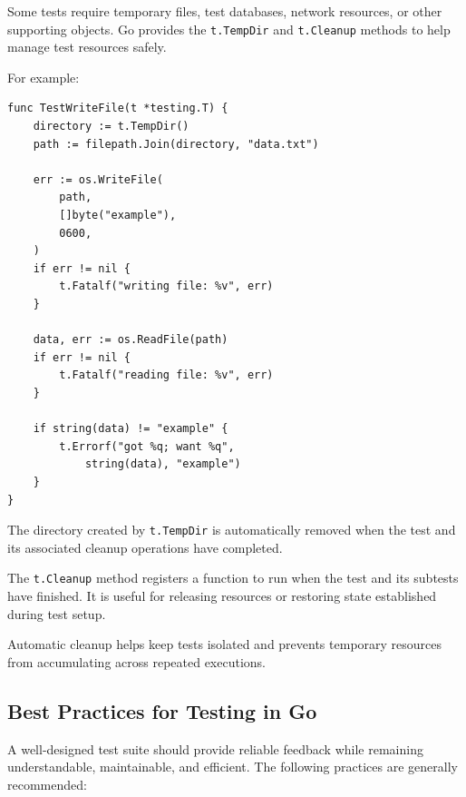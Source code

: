 Some tests require temporary files, test databases, network resources, or other supporting objects. Go provides the \texttt{t.TempDir} and \texttt{t.Cleanup} methods to help manage test resources safely.

For example:

\begin{lstlisting}
func TestWriteFile(t *testing.T) {
    directory := t.TempDir()
    path := filepath.Join(directory, "data.txt")

    err := os.WriteFile(
        path,
        []byte("example"),
        0600,
    )
    if err != nil {
        t.Fatalf("writing file: %v", err)
    }

    data, err := os.ReadFile(path)
    if err != nil {
        t.Fatalf("reading file: %v", err)
    }

    if string(data) != "example" {
        t.Errorf("got %q; want %q",
            string(data), "example")
    }
}
\end{lstlisting}

The directory created by \texttt{t.TempDir} is automatically removed when the test and its associated cleanup operations have completed.

The \texttt{t.Cleanup} method registers a function to run when the test and its subtests have finished. It is useful for releasing resources or restoring state established during test setup.

Automatic cleanup helps keep tests isolated and prevents temporary resources from accumulating across repeated executions.

\subsection{Best Practices for Testing in Go}

A well-designed test suite should provide reliable feedback while remaining understandable, maintainable, and efficient. The following practices are generally recommended:

